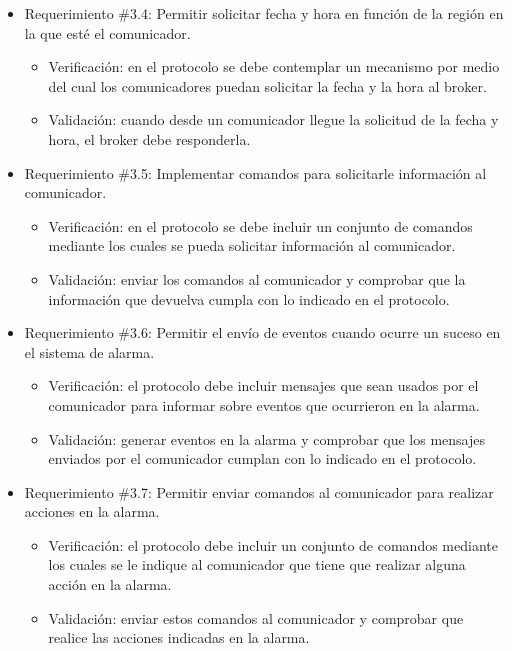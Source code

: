 \documentclass[
11pt, %
]{charter}
\begin{document}
\begin{itemize}
	\item Requerimiento \#3.4: Permitir solicitar fecha y hora en función de la región en la que esté el comunicador.
	\begin{itemize}
		\item Verificación: en el protocolo se debe contemplar un mecanismo por medio del cual los comunicadores puedan solicitar la fecha y la hora al broker.
		\item Validación: cuando desde un comunicador llegue la solicitud de la fecha y hora, el broker debe responderla.
	\end{itemize}
			
	\item Requerimiento \#3.5: Implementar comandos para solicitarle información al comunicador.
	\begin{itemize}
		\item Verificación: en el protocolo se debe incluir un conjunto de comandos mediante los cuales se pueda solicitar información al comunicador.
		\item Validación: enviar los comandos al comunicador y comprobar que la información que devuelva cumpla con lo indicado en el protocolo.
	\end{itemize}
			
	\item Requerimiento \#3.6: Permitir el envío de eventos cuando ocurre un suceso en el sistema de alarma.
	\begin{itemize}
		\item Verificación: el protocolo debe incluir mensajes que sean usados por el comunicador  para informar sobre eventos que ocurrieron en la alarma.
		\item Validación: generar eventos en la alarma y comprobar que los mensajes enviados por el comunicador cumplan con lo indicado en el protocolo.
	\end{itemize}
			
	\item Requerimiento \#3.7: Permitir enviar comandos al comunicador para realizar acciones en la alarma.
	\begin{itemize}
		\item Verificación: el protocolo debe incluir un conjunto de comandos mediante los cuales se le indique al comunicador que tiene que realizar alguna acción en la alarma.
		\item Validación: enviar estos comandos al comunicador y comprobar que realice las acciones indicadas en la alarma.
	\end{itemize}
			

\end{itemize}
\end{document}
